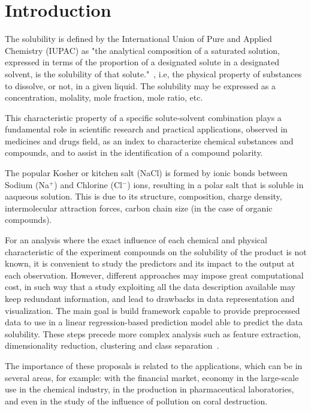 \section{Introduction}

The solubility is defined by the International Union of Pure and Applied Chemistry (IUPAC) as "the analytical composition of a saturated solution, expressed in terms of the proportion of a designated solute in a designated solvent, is the solubility of that solute."~\cite{Book1}, i.e, the physical property of substances to dissolve, or not, in a given liquid. The solubility may be expressed as a concentration, molality, mole fraction, mole ratio, etc. 

This characteristic property of a specific solute-solvent combination plays a fundamental role in scientific research and practical applications, observed in medicines and drugs field, as an index to characterize chemical substances and compounds, and to assist in the identification of a compound polarity.

The popular Kosher or kitchen salt (NaCl) is formed by ionic bonds between Sodium (Na$^+$) and Chlorine (Cl$^-$) ions, resulting in a polar salt that is soluble in aaqueous solution. This is due to its structure, composition, charge density, intermolecular attraction forces, carbon chain size (in the case of organic compounds).

For an analysis where the exact influence of each chemical and physical characteristic of the experiment compounds on the solubility of the product is not known, it is convenient to study the predictors and its impact to the output at each observation. However, different approaches may impose great computational cost, in such way that a study exploiting all the data description available may keep redundant information, and lead to drawbacks in data representation and visualization. The main goal is build framework capable to provide preprocessed data to use in a linear regression-based prediction model able to predict the data solubility. These steps precede more complex analysis such as feature extraction, dimensionality reduction, clustering and class separation~\cite{Hastie2009, Kuhn2013, James2013}.

The importance of these proposals is related to the applications, which can be in several areas, for example: with the financial market, economy in the large-scale use in the chemical industry, in the production in pharmaceutical laboratories, and even in the study of the influence of pollution on coral destruction.

